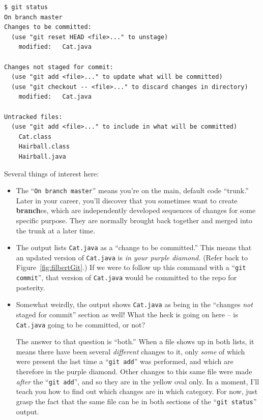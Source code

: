 \begin{Verbatim}[fontsize=\scriptsize,samepage=true,frame=single]
$ git status
On branch master
Changes to be committed:
  (use "git reset HEAD <file>..." to unstage)
    modified:   Cat.java

Changes not staged for commit:
  (use "git add <file>..." to update what will be committed)
  (use "git checkout -- <file>..." to discard changes in directory)
    modified:   Cat.java

Untracked files:
  (use "git add <file>..." to include in what will be committed)
    Cat.class
    Hairball.class
    Hairball.java
\end{Verbatim}

Several things of interest here:

\begin{itemize}

\item The ``\texttt{On branch master}'' means you're on the main, default code
``trunk.'' Later in your career, you'll discover that you sometimes want to
create \textbf{branch}es, which are independently developed sequences of
changes for some specific purpose. They are normally brought back together and
merged into the trunk at a later time.

\item The output lists \texttt{Cat.java} as a ``change to be committed.'' This
means that an updated version of \texttt{Cat.java} is \textit{in your purple
diamond.} (Refer back to Figure~\ref{fig:filbertGit}.) If we were to follow up
this command with a ``\texttt{git commit}'', that version of \texttt{Cat.java}
would be committed to the repo for posterity.

\item Somewhat weirdly, the output shows \texttt{Cat.java} as being in the
``changes \textit{not} staged for commit'' section as well! What the heck is
going on here -- is \texttt{Cat.java} going to be committed, or not?

The answer to that question is ``both.'' When a file shows up in both lists,
it means there have been several \textit{different} changes to it, only
\textit{some} of which were present the last time a ``\texttt{git add}'' was
performed, and which are therefore in the purple diamond. Other changes to this
same file were made \textit{after} the ``\texttt{git add}'', and so they are
in the yellow oval only. In a moment, I'll teach you how to find out which
changes are in which category. For now, just grasp the fact that the same file
can be in both sections of the ``\texttt{git status}'' output.


\end{itemize}
